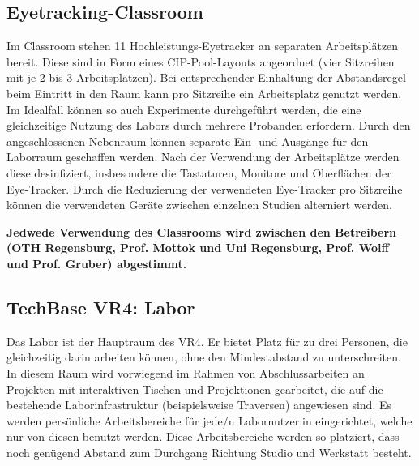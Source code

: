 \subsection{Eyetracking-Classroom}\label{subsec:labore_eyetracking}


\noindent
Im Classroom stehen 11 Hochleistungs-Eyetracker an separaten Arbeitsplätzen bereit.
Diese sind in Form eines CIP-Pool-Layouts angeordnet (vier Sitzreihen mit je 2 bis 3 Arbeitsplätzen).
Bei entsprechender Einhaltung der Abstandsregel beim Eintritt in den Raum kann pro Sitzreihe ein Arbeitsplatz genutzt werden.
Im Idealfall können so auch Experimente durchgeführt werden, die eine gleichzeitige Nutzung des Labors durch mehrere Probanden erfordern.
Durch den angeschlossenen Nebenraum können separate Ein- und Ausgänge für den Laborraum geschaffen werden.
Nach der Verwendung der Arbeitsplätze werden diese desinfiziert, insbesondere die Tastaturen, Monitore und Oberflächen der Eye-Tracker.
Durch die Reduzierung der verwendeten Eye-Tracker pro Sitzreihe können die verwendeten Geräte zwischen einzelnen Studien alterniert werden.

\medskip

\noindent
\textbf{Jedwede Verwendung des Classrooms wird zwischen den Betreibern (OTH Regensburg, Prof. Mottok und Uni Regensburg, Prof. Wolff und Prof. Gruber) abgestimmt.}

\subsection{TechBase VR4: Labor}\label{subsec:labore_vr4_labor}


\noindent
Das Labor ist der Hauptraum des VR4. Er bietet Platz für zu drei Personen, die gleichzeitig darin arbeiten können, ohne den Mindestabstand zu unterschreiten. In diesem Raum wird vorwiegend im Rahmen von Abschlussarbeiten an Projekten mit interaktiven Tischen und Projektionen gearbeitet, die auf die bestehende Laborinfrastruktur (beispielsweise Traversen) angewiesen sind.
Es werden persönliche Arbeitsbereiche für jede/n Labornutzer:in eingerichtet, welche nur von diesen benutzt werden.
Diese Arbeitsbereiche werden so platziert, dass noch genügend Abstand zum Durchgang Richtung Studio und Werkstatt besteht.

